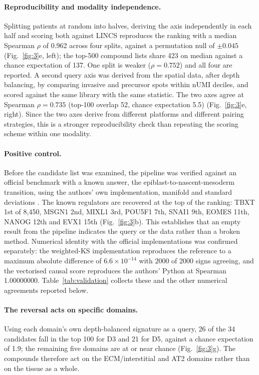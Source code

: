 \paragraph{Reproducibility and modality independence.} Splitting patients at random into
halves, deriving the axis independently in each half and scoring both against LINCS
reproduces the ranking with a median Spearman $\rho$ of 0.962 across four splits, against a
permutation null of $\pm0.045$ (Fig.~\ref{fig:3}e, left); the top-500 compound lists share
423 on median against a chance expectation of 137. One split is weaker ($\rho=0.752$)
and all four are reported. A second query axis was derived from the spatial data, after
depth balancing, by comparing invasive and precursor spots within nUMI deciles, and scored
against the same library with the same statistic. The two axes agree at Spearman
$\rho=0.735$ (top-100 overlap 52, chance expectation 5.5) (Fig.~\ref{fig:3}e, right). Since
the two axes derive from different platforms and different pairing strategies, this is a
stronger reproducibility check than repeating the scoring scheme within one modality.

\paragraph{Positive control.} Before the candidate list was examined, the pipeline was
verified against an official benchmark with a known answer, the epiblast-to-nascent-mesoderm
transition, using the authors' own implementation, manifold and standard deviations
\citep{pan2026scmg}. The known regulators are recovered at the top of the ranking: TBXT 1st
of 8,450, MSGN1 2nd, MIXL1 3rd, POU5F1 7th, SNAI1 9th, EOMES 11th, NANOG 12th and EVX1 15th
(Fig.~\ref{fig:3}b). This establishes that an empty result from the pipeline indicates the
query or the data rather than a broken method. Numerical identity with the official
implementations was confirmed separately: the weighted-KS implementation reproduces the
reference to a maximum absolute difference of $6.6\times10^{-14}$ with 2000 of 2000 signs
agreeing, and the vectorised causal score reproduces the authors' Python at Spearman
1.00000000. Table~\ref{tab:validation} collects these and the other numerical agreements
reported below.

\paragraph{The reversal acts on specific domains.} Using each domain's own depth-balanced
signature as a query, 26 of the 34 candidates fall in the top 100 for D3 and 21 for D5,
against a chance expectation of 1.9; the remaining five domains are at or near chance
(Fig.~\ref{fig:3}g). The compounds therefore act on the ECM/interstitial and AT2 domains
rather than on the tissue as a whole.

